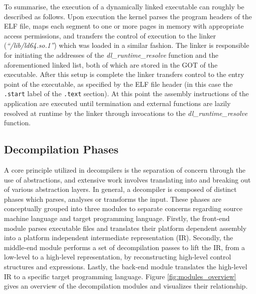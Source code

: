 To summarise, the execution of a dynamically linked executable can roughly be described as follows. Upon execution the kernel parses the program headers of the ELF file, maps each segment to one or more pages in memory with appropriate access permissions, and transfers the control of execution to the linker (\textit{``/lib/ld64.so.1''}) which was loaded in a similar fashion. The linker is responsible for initiating the addresses of the \textit{dl\_runtime\_resolve} function and the aforementioned linked list, both of which are stored in the GOT of the executable. After this setup is complete the linker transfers control to the entry point of the executable, as specified by the ELF file header (in this case the \texttt{.start} label of the \texttt{.text} section). At this point the assembly instructions of the application are executed until termination and external functions are lazily resolved at runtime by the linker through invocations to the \textit{dl\_runtime\_resolve} function.


\subsection{Decompilation Phases}

A core principle utilized in decompilers is the separation of concern through the use of abstractions, and extensive work involves translating into and breaking out of various abstraction layers. In general, a decompiler is composed of distinct phases which parses, analyses or transforms the input. These phases are conceptually grouped into three modules to separate concerns regarding source machine language and target programming language. Firstly, the front-end module parses executable files and translates their platform dependent assembly into a platform independent intermediate representation (IR). Secondly, the middle-end module performs a set of decompilation passes to lift the IR, from a low-level to a high-level representation, by reconstructing high-level control structures and expressions. Lastly, the back-end module translates the high-level IR to a specific target programming language. Figure \ref{fig:modules_overview} gives an overview of the decompilation modules and visualizes their relationship.

